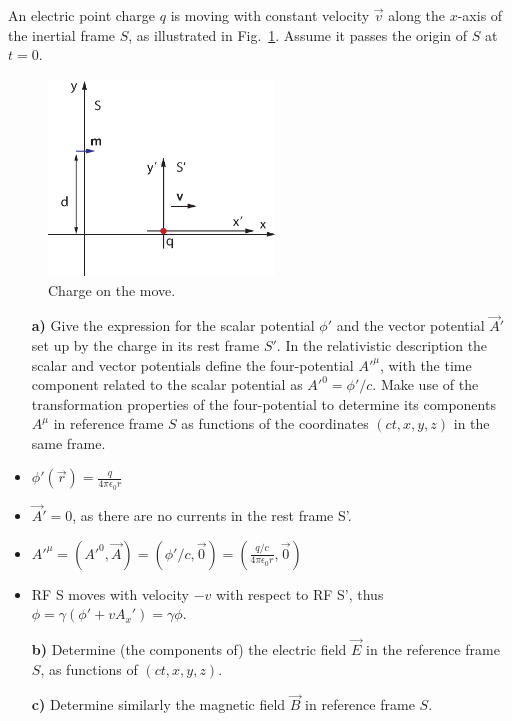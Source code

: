 \documentclass[11pt,a4paper]{report}
\newcounter{excount}[chapter]
\newenvironment{exercise}[1][]{\addtocounter{excount}{1} \noindent {\bf Problem
    \arabic{excount} \ \ #1}\hspace{2mm}}{\vspace{4mm}}
\begin{document}
\begin{exercise}
An electric point charge $q$ is moving with constant velocity $\vec v$ along the $x$-axis of the inertial frame $S$, as illustrated in Fig.~\ref{fig:dipole}. Assume it passes the origin of $S$ at $t=0$.

\begin{figure}[h]
\begin{center}
\includegraphics[width=6cm]{dipole.eps}
\end{center}
\caption{Charge on the move. \label{fig:dipole}}
\end{figure}

\begin{itemize}
\item[{\bf a)}] Give the expression for the scalar potential $\phi'$ and the vector potential $\vec A'$ set up by the charge in its rest frame $S'$. In the relativistic description the scalar and vector potentials define the four-potential $A'^\mu$, with the time component related to the scalar potential as $A'^0=\phi'/c$.  Make use of the transformation properties of the four-potential to determine its components $A^\mu$ in reference frame $S$ as functions of the coordinates $(ct, x, y, z)$ in the same frame.

\item $\phi' (\vec r)=\frac{q}{4\pi \epsilon_0 r} $
\item $\vec A' =0$, as there are no currents in the rest frame S'.
\item $A'^{\mu}=(A'^0,\vec A)=(\phi' / c, \vec 0)=(\frac{q/c}{4\pi \epsilon_0 r },\vec 0)$
\item RF S moves with velocity $-v$ with respect to RF S', thus $\phi=\gamma(\phi'+vA_x')=\gamma \phi$.
\item[{\bf b)}] Determine (the components of) the electric field  $\vec E$  in the reference frame $S$, as functions of $(ct, x, y, z)$.
\item[{\bf c)}] Determine similarly the magnetic field  $\vec B$  in reference frame $S$.
\end{itemize}


\end{exercise}
\end{document}
